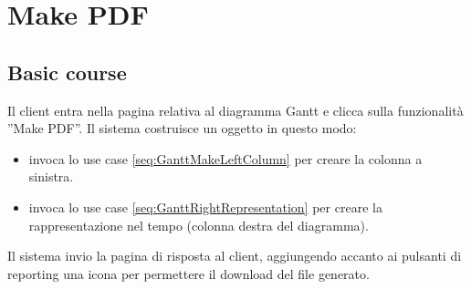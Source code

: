 \section{Make PDF}
\label{seq:GanttMakePDF}

\subsection{Basic course}
Il client entra nella pagina relativa al diagramma Gantt e clicca sulla 
funzionalit\`a ''Make PDF''. Il sistema costruisce un oggetto in questo modo:
\begin{itemize}
  \item invoca lo use case \ref{seq:GanttMakeLeftColumn} per creare la
  colonna a sinistra.
  \item invoca lo use case \ref{seq:GanttRightRepresentation} per creare
  la rappresentazione nel tempo (colonna destra del diagramma).
\end{itemize}
Il sistema invio la pagina di risposta al client, aggiungendo accanto ai
pulsanti di reporting una icona per permettere il download del file generato.  

